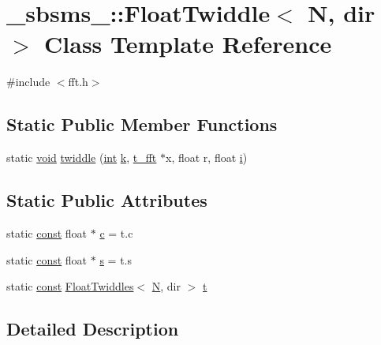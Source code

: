 \hypertarget{class__sbsms___1_1_float_twiddle}{}\section{\+\_\+sbsms\+\_\+\+:\+:Float\+Twiddle$<$ N, dir $>$ Class Template Reference}
\label{class__sbsms___1_1_float_twiddle}


{\ttfamily \#include $<$fft.\+h$>$}

\subsection*{Static Public Member Functions}
\begin{DoxyCompactItemize}
\item 
static \hyperlink{sound_8c_ae35f5844602719cf66324f4de2a658b3}{void} \hyperlink{class__sbsms___1_1_float_twiddle_aa43a4bdeb4e623784a9041abbb8be083}{twiddle} (\hyperlink{xmltok_8h_a5a0d4a5641ce434f1d23533f2b2e6653}{int} \hyperlink{rfft2d_test_m_l_8m_adc468c70fb574ebd07287b38d0d0676d}{k}, \hyperlink{namespace__sbsms___af5c6f976b2da21c36853e3b0c5995a54}{t\+\_\+fft} $\ast$x, float r, float \hyperlink{checksum_8c_ab80e330a3bc9e38c1297fe17381e92b4}{i})
\end{DoxyCompactItemize}
\subsection*{Static Public Attributes}
\begin{DoxyCompactItemize}
\item 
static \hyperlink{getopt1_8c_a2c212835823e3c54a8ab6d95c652660e}{const} float $\ast$ \hyperlink{class__sbsms___1_1_float_twiddle_a90b12f24dd294f2c9eb0b78f4c8e6c58}{c} = t.\+c
\item 
static \hyperlink{getopt1_8c_a2c212835823e3c54a8ab6d95c652660e}{const} float $\ast$ \hyperlink{class__sbsms___1_1_float_twiddle_a15c969050901d72bc0276c7842e5c203}{s} = t.\+s
\item 
static \hyperlink{getopt1_8c_a2c212835823e3c54a8ab6d95c652660e}{const} \hyperlink{class__sbsms___1_1_float_twiddles}{Float\+Twiddles}$<$ \hyperlink{rfft2d_test_m_l_8m_af6d1246b147a7c5763d9fc83082020ff}{N}, dir $>$ \hyperlink{class__sbsms___1_1_float_twiddle_a86888846643be848b3dc3e11e60043e2}{t}
\end{DoxyCompactItemize}


\subsection{Detailed Description}
